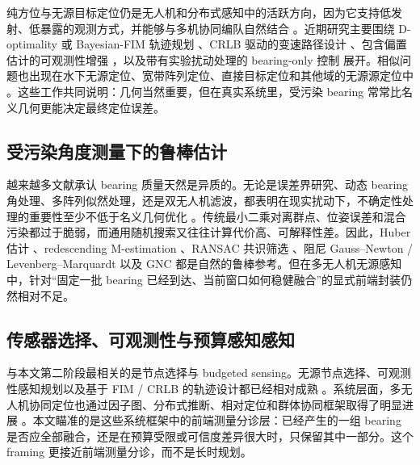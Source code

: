 \documentclass[drones,article,submit,moreauthors]{Definitions/mdpi}
\begin{document}
纯方位与无源目标定位仍是无人机和分布式感知中的活跃方向，因为它支持低发射、低暴露的观测方式，并能够与多机协同编队自然结合 \cite{li2025bearing,kang2024aoa,huang2025emcompat,xing2025node}。近期研究主要围绕 D-optimality 或 Bayesian-FIM 轨迹规划 \cite{zou2024revisit,dogancay2024bayesian}、CRLB 驱动的变速路径设计 \cite{chen2025variable,peng2024trajectory}、包含偏置估计的可观测性增强 \cite{wang2025bio}，以及带有实验扰动处理的 bearing-only 控制 \cite{sui2024adaptive,dou2025moving} 展开。相似问题也出现在水下无源定位、宽带阵列定位、直接目标定位和其他域的无源源定位中 \cite{mei2024bearing,zong2025distributed,yu2025passive,wu2026bearing,zeng2026three,zhou2026direct,chen2025research}。这些工作共同说明：几何当然重要，但在真实系统里，受污染 bearing 常常比名义几何更能决定最终定位误差。

\subsection{受污染角度测量下的鲁棒估计}

越来越多文献承认 bearing 质量天然是异质的。无论是误差界研究、动态 bearing 角处理、多阵列似然处理，还是双无人机滤波，都表明在现实扰动下，不确定性处理的重要性至少不低于名义几何优化 \cite{chen2025error,luo2025dynamicbearing,hu2025cyclic,yin2025dual}。传统最小二乘对离群点、位姿误差和混合污染都过于脆弱，而通用随机搜索又往往计算代价高、可解释性差。因此，Huber 估计 \cite{huber1964robust}、redescending M-estimation \cite{beaton1974fitting}、RANSAC 共识筛选 \cite{fischler1981ransac}、阻尼 Gauss--Newton / Levenberg--Marquardt \cite{levenberg1944method,marquardt1963algorithm} 以及 GNC \cite{yang2020gnc} 都是自然的鲁棒参考。但在多无人机无源感知中，针对“固定一批 bearing 已经到达、当前窗口如何稳健融合”的显式前端封装仍然相对不足。

\subsection{传感器选择、可观测性与预算感知感知}

与本文第二阶段最相关的是节点选择与 budgeted sensing。无源节点选择、可观测性感知规划以及基于 FIM / CRLB 的轨迹设计都已经相对成熟 \cite{xing2025node,chen2025variable,wang2025bio,zou2024revisit,dogancay2024bayesian,peng2024trajectory}。系统层面，多无人机协同定位也通过因子图、分布式推断、相对定位和群体协同框架取得了明显进展 \cite{yang2020tightly,yang2024distributed,qian2025cooperative,li2025tcdrl,li2026formation,ding2026set,zhang2026multi}。本文瞄准的是这些系统框架中的前端测量分诊层：已经产生的一组 bearing 是否应全部融合，还是在预算受限或可信度差异很大时，只保留其中一部分。这个 framing 更接近前端测量分诊，而不是长时规划。
\end{document}
